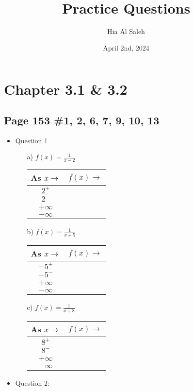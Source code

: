 \documentclass{article}
\title{Practice Questions}
\author{Hia Al Saleh}
\date{April 2nd, 2024}
\begin{document}
\maketitle
\section*{Chapter 3.1 \& 3.2}
\subsection*{Page 153 \#1, 2, 6, 7, 9, 10, 13}
\begin{itemize}
\item Question 1
\begin{enumerate}
    \item[a)] $f(x)=\frac{1}{x-2}$
\begin{tabular}{|c|c|}
    \hline
    \textbf{As $x \to$} & \textbf{$f(x) \to$} \\
    \hline
    $2^+$ & \\
    \hline
    $2^-$ & \\
    \hline
    $+\infty$ & \\
    \hline
    $-\infty$ & \\
    \hline
\end{tabular}
    \item[b)] $f(x)=\frac{1}{x+5}$
\begin{tabular}{|c|c|}
    \hline
    \textbf{As $x \to$} & \textbf{$f(x) \to$} \\
    \hline
    $-5^+$ & \\
    \hline
    $-5^-$ & \\
    \hline
    $+\infty$ & \\
    \hline
    $-\infty$ & \\
    \hline
\end{tabular}
    \item[c)] $f(x)=\frac{1}{x+8}$
\begin{tabular}{|c|c|}
    \hline
    \textbf{As $x \to$} & \textbf{$f(x) \to$} \\
    \hline
    $8^+$ & \\
    \hline
    $8^-$ & \\
    \hline
    $+\infty$ & \\
    \hline
    $-\infty$ & \\
    \hline
\end{tabular}
\end{enumerate}
\item Question 2: 
\begin{enumerate}

\end{enumerate}
\end{itemize}
\end{document}
